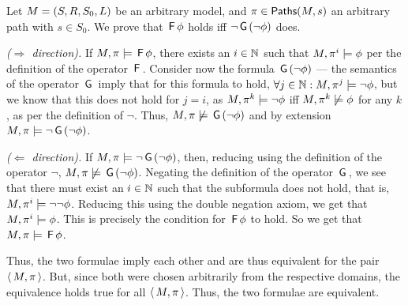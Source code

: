 
Let $M = (S, R, S_0, L)$ be an arbitrary model, and 
$\pi \in \textsf{Paths}(M, s)$ an arbitrary path with $s \in S_0$.
We prove that $\,\textsf{F}\, \phi$ holds iff $\lnot \,\textsf{G}\, (\lnot \phi)$ does.

\emph{($\Rightarrow$ direction).} If $M, \pi \models \,\textsf{F}\, \phi$,
there exists an $i \in \mathbb{N}$ such that $M, \pi^i \models \phi$
per the definition of the operator $\,\textsf{F}\,$. Consider now the formula
$\,\textsf{G}\, (\lnot \phi)$ --- the semantics of the operator $\,\textsf{G}\,$ imply that
for this formula to hold, $\forall j \in \mathbb{N} : M, \pi^j \models
\lnot \phi$, but we know that this does not hold for $j = i$, as 
$M, \pi^k \models \lnot \phi$ iff $M, \pi^k \not \models \phi$
for any $k$, as per the definition of $\lnot$. Thus, 
$M, \pi \not \models \,\textsf{G}\,(\lnot \phi)$ and by extension
$M, \pi \models \lnot \,\textsf{G}\,(\lnot \phi)$.

\emph{($\Leftarrow$ direction).} If $M, \pi \models \lnot \,\textsf{G}\, (\lnot \phi)$,
then, reducing using the definition of the operator $\lnot$, 
$M, \pi \not \models \,\textsf{G}\, (\lnot \phi)$. Negating the definition
of the operator $\,\textsf{G}\,$, we see that there must exist an $i \in \mathbb{N}$
such that the subformula does not hold, that is, $M, \pi^i \models \lnot \lnot \phi$.
Reducing this using the double negation axiom, we get that $M, \pi^i \models \phi$.
This is precisely the condition for $\,\textsf{F}\, \phi$ to hold. So we get that
$M, \pi \models \,\textsf{F}\, \phi$.

Thus, the two formulae imply each other and are thus equivalent for the pair
$\langle\,M, \pi\,\rangle$. But, since both were chosen arbitrarily from the
respective domains, the equivalence holds true for all $\langle\,M, \pi\,\rangle$.
Thus, the two formulae are equivalent.